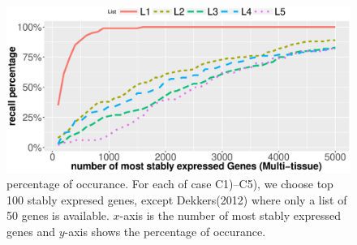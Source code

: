 \documentclass[11pt, a4paper]{article}
\begin{document}

\begin{figure}[h!]
    \begin{center}
	\includegraphics[scale=0.5]{Figures/rankVSrank_RNA2.eps}
	\caption{percentage of occurance. For each of case C1)--C5), we choose top 100 stably expresed genes, except Dekkers(2012) where only a list of 50 genes is available. $x$-axis is the number of most stably expressed genes and $y$-axis shows the percentage of occurance.}
	\label{fig:rankVSrank_RNA}
    \end{center}
\end{figure}
\end{document}
